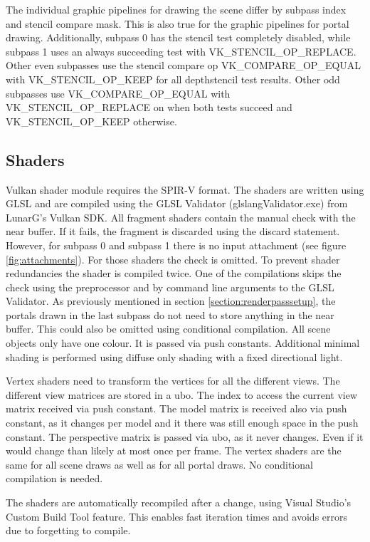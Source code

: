 The individual graphic pipelines for drawing the scene differ by subpass index and stencil compare mask. This is also true for the graphic pipelines for portal drawing. Additionally, subpass 0 has the stencil test completely disabled, while subpass 1 uses an always succeeding test with VK\_STENCIL\_OP\_REPLACE. Other even subpasses use the stencil compare op VK\_COMPARE\_OP\_EQUAL with VK\_STENCIL\_OP\_KEEP for all depthstencil test results. Other odd subpasses use VK\_COMPARE\_OP\_EQUAL with VK\_STENCIL\_OP\_REPLACE on when both tests succeed and  VK\_STENCIL\_OP\_KEEP otherwise.

\subsection{Shaders}
Vulkan shader module requires the SPIR-V format. The shaders are written using GLSL and are compiled using the GLSL Validator (glslangValidator.exe) from LunarG's Vulkan SDK. All fragment shaders contain the manual check with the near buffer. If it fails, the fragment is discarded using the discard statement. However, for subpass 0 and subpass 1 there is no input attachment (see figure \ref{fig:attachments}). For those shaders the check is omitted. To prevent shader redundancies the shader is compiled twice. One of the compilations skips the check using the preprocessor and by command line arguments to the GLSL Validator. As previously mentioned in section \ref{section:renderpasssetup}, the portals drawn in the last subpass do not need to store anything in the near buffer. This could also be omitted using conditional compilation. All scene objects only have one colour. It is passed via push constants. Additional minimal shading is performed using diffuse only shading with a fixed directional light.

Vertex shaders need to transform the vertices for all the different views. The different view matrices are stored in a \gls{ubo}. The index to access the current view matrix received via push constant. The model matrix is received also via push constant, as it changes per model and it there was still enough space in the push constant. The perspective matrix is passed via \gls{ubo}, as it never changes. Even if it would change than likely at most once per frame. The vertex shaders are the same for all scene draws as well as for all portal draws. No conditional compilation is needed.


The shaders are automatically recompiled after a change, using Visual Studio's Custom Build Tool feature. This enables fast iteration times and avoids errors due to forgetting to compile.

